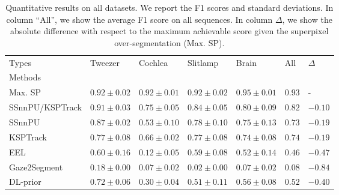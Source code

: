 \begin{table*}[t]
\centering
\caption{
    Quantitative results on all datasets. We report the F1 scores and standard deviations.
    In column ``All'', we show the average F1 score on all sequences.
    In column $\Delta$, we show the absolute difference with respect to the maximum achievable score given the superpixel over-segmentation (Max. SP).
    }
\label{tab:results}
\begin{tabular}{llp{1.8cm}p{1.8cm}p{1.8cm}p{1.8cm}p{1.8cm}}
\toprule
Types &              Tweezer &              Cochlea &             Slitlamp &                Brain &          All &      $\Delta$ \\
Methods         &                      &                      &                      &                      &              &               \\
\midrule
Max. SP         &       $0.92\pm 0.02$ &       $0.92\pm 0.01$ &       $0.92\pm 0.02$ &       $0.95\pm 0.01$ &       $0.93$ &             - \\
\hline

SSnnPU/KSPTrack &  $\bm{0.91}\pm 0.03$ &  $\bm{0.75}\pm 0.05$ &  $\bm{0.84}\pm 0.05$ &  $\bm{0.80}\pm 0.09$ &  $\bm{0.82}$ &  $\bm{-0.10}$ \\
SSnnPU          &       $0.87\pm 0.02$ &       $0.53\pm 0.10$ &       $0.78\pm 0.10$ &       $0.75\pm 0.13$ &       $0.73$ &       $-0.19$ \\
\hdashline
KSPTrack        &       $0.77\pm 0.08$ &       $0.66\pm 0.02$ &       $0.77\pm 0.08$ &       $0.74\pm 0.08$ &       $0.74$ &       $-0.19$ \\
EEL             &       $0.60\pm 0.16$ &       $0.12\pm 0.05$ &       $0.59\pm 0.08$ &       $0.52\pm 0.14$ &       $0.46$ &       $-0.47$ \\
Gaze2Segment    &       $0.18\pm 0.00$ &       $0.07\pm 0.02$ &       $0.02\pm 0.00$ &       $0.07\pm 0.02$ &       $0.08$ &       $-0.84$ \\
DL-prior        &       $0.72\pm 0.06$ &       $0.30\pm 0.04$ &       $0.51\pm 0.11$ &       $0.56\pm 0.08$ &       $0.52$ &       $-0.40$ \\
\bottomrule
\end{tabular}
\end{table*}
